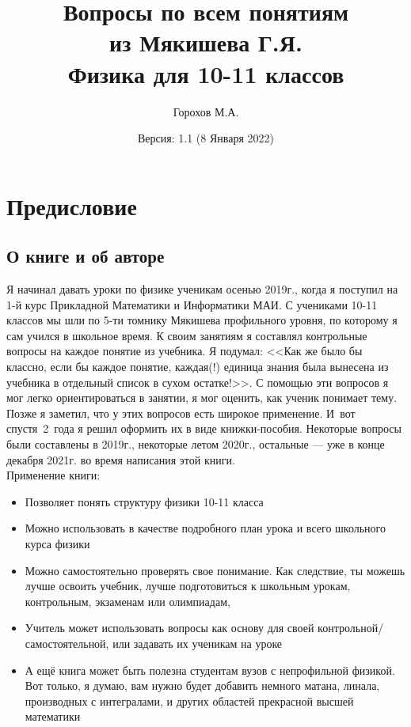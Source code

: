 \documentclass[12pt,a4paper]{report}
\title{Вопросы по всем понятиям\\из Мякишева Г.Я.\\Физика для 10-11 классов}
\author{Горохов М.А.}
\date{Версия: 1.1 (8 Января 2022)}
\begin{document}
\setcounter{tocdepth}{0}
\maketitle


\tableofcontents

\chapter*{Предисловие}

\section{О книге и об авторе}
Я начинал давать уроки по физике ученикам осенью 2019г., когда я поступил на 1-й курс Прикладной Математики и Информатики МАИ. С учениками 10-11 классов мы шли по 5-ти томнику Мякишева профильного уровня, по которому я сам учился в школьное время. К своим занятиям я составлял контрольные вопросы на каждое понятие из учебника. Я подумал: <<Как же было бы классно, если бы каждое понятие, каждая(!) единица знания была вынесена из учебника в отдельный список в сухом остатке!>>. С помощью эти вопросов я мог легко ориентироваться в занятии, я мог оценить, как ученик понимает тему. Позже я заметил, что у этих вопросов есть широкое применение. И~вот спустя~2~года я решил оформить их в виде книжки-пособия. Некоторые вопросы были составлены в 2019г., некоторые летом 2020г., остальные --- уже в конце декабря 2021г. во время написания этой книги. \\

Применение книги:
\begin{itemize}
\item Позволяет понять структуру физики 10-11 класса
\item Можно использовать в качестве подробного план урока и всего школьного курса физики
\item Можно самостоятельно проверять свое понимание. Как следствие, ты можешь лучше освоить учебник, лучше подготовиться к школьным урокам, контрольным, экзаменам или олимпиадам, 
\item Учитель может использовать вопросы как основу для своей контрольной/самостоятельной, или задавать их ученикам на уроке
\item А ещё книга может быть полезна студентам вузов с непрофильной физикой. Вот только, я думаю, вам нужно будет добавить немного матана, линала, производных с интегралами, и других областей прекрасной высшей математики
\end{itemize}
\end{document}
